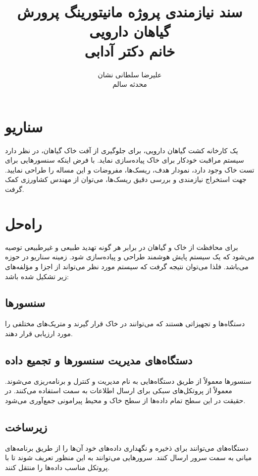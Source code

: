 \documentclass[a4paper]{report}
\title{
    سند نیازمندی پروژه مانیتورینگ پرورش گیاهان دارویی \\
    خانم دکتر آدابی \\ 
    \versionnumber
}
\author{
    علیرضا سلطانی نشان \\
    محدثه سالم \\
}
\begin{document}
\maketitle

\section*{سناریو}

یک کارخانه کشت‌ گیاهان دارویی، برای جلوگیری از آفت خاک گیاهان، در نظر دارد سیستم
مراقبت خودکار برای خاک پیاده‌سازی نماید. با فرض اینکه سنسورهایی برای تست خاک
وجود دارد، نمودار هدف، ریسک‌ها، مفروضات و  این مساله را طراحی نمایید.
جهت استخراج نیازمندی و بررسی دقیق ریسک‌ها، می‌توان از مهندس کشاورزی کمک گرفت.

\section*{راه‌حل}

برای محافظت از خاک و گیاهان در برابر هر گونه تهدید طبیعی و غیرطبیعی توصیه می‌شود
که یک سیستم پایش هوشمند  طراحی و پیاده‌سازی
شود. زمینه سناریو در حوزه  می‌باشد. فلذا می‌توان نتیجه گرفت که سیستم
مورد نظر می‌تواند از اجزا و مؤلفه‌های زیر تشکیل شده باشد:

\subsection*{سنسور‌ها}

دستگاه‌ها و تجهیزاتی هستند که می‌توانند در خاک قرار گیرند و متریک‌های مختلفی را
مورد ارزیابی قرار دهند.

\subsection*{دستگاه‌های مدیریت سنسور‌ها و تجمیع داده}

سنسور‌ها معمولاً از طریق دستگاه‌هایی به نام  مدیریت و کنترل و
برنامه‌ریزی می‌شوند. معمولاً از پروتکل‌های سبکی برای ارسال اطلاعات به سمت
 استفاده می‌کنند. در حقیقت در این سطح تمام داده‌ها از سطح خاک و محیط
پیرامونی جمع‌آوری می‌شود.

\subsection*{زیرساخت}

دستگا‌ه‌های  می‌توانند برای ذخیره و نگهداری داده‌های خود آن‌ها
را از طریق برنامه‌های میانی به سمت سرور ارسال کنند. سرو‌ر‌هایی می‌توانند به این
منظور تعریف شوند تا با پروتکل مناسب داده‌ها را منتقل کنند.
\end{document}
